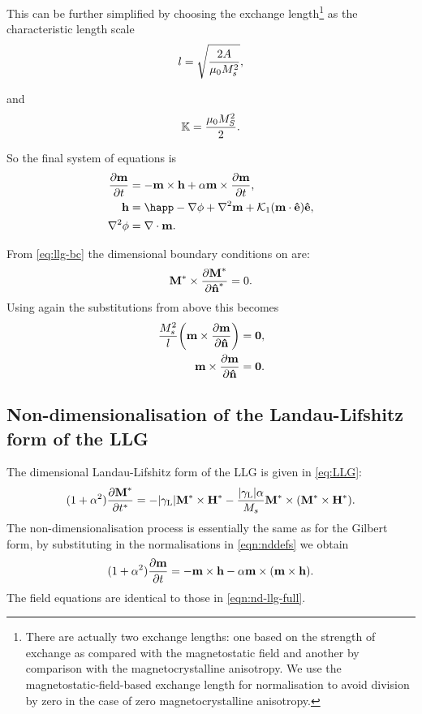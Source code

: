 This can be further simplified by choosing the exchange length\footnote{There are actually two exchange lengths: one based on the strength of exchange as compared with the magnetostatic field and another by comparison with the magnetocrystalline anisotropy. We use the magnetostatic-field-based exchange length for normalisation to avoid division by zero in the case of zero magnetocrystalline anisotropy.} as the characteristic length scale
\begin{equation}
  \label{eqn:l-normalisation}
  l = \sqrt{ \frac{2 A}{\mu_0 M_s^2} },
\end{equation}

and
\begin{equation}
  \label{k-normalisation}
  \mathbb{K} = \frac{ \mu_0 M_S^2}{2}.
\end{equation}

So the final system of equations is
\begin{equation}
  \begin{aligned}
    \dmdt &= - \mv \times \hv + \alpha \mv \times \dmdt, \\
    \hv &= \happ - \grad \phi + \lap \mv + \kone (\mv \cdot \ev) \ev, \\
    \lap \phi &= \div \mv.
    \label{eqn:nd-llg-full}
  \end{aligned}
\end{equation}

From \cref{eq:llg-bc} the dimensional boundary conditions on are:
\begin{equation}
  \boldsymbol{\mathrm{M}}^* \times \frac{\partial \boldsymbol{\mathrm{M}}^*}{\partial \boldsymbol{\mathrm{\hat{n}}}^*} = 0.
\end{equation}
Using again the substitutions from above this becomes
\begin{equation}
  \begin{aligned}
    \frac{M_s^2}{l}{\left( \boldsymbol{\mathrm{m}} \times \frac{\partial \boldsymbol{\mathrm{m}}}{\partial \boldsymbol{\mathrm{\hat{n}}}} \right)} &= \mathbf{0}, \\
    \boldsymbol{\mathrm{m}} \times \frac{\partial \boldsymbol{\mathrm{m}}}{\partial \boldsymbol{\mathrm{\hat{n}}}} &= \mathbf{0}.
    \label{eq:103}
  \end{aligned}
\end{equation}

\subsection{Non-dimensionalisation of the Landau-Lifshitz form of the LLG}
\label{sec:land-lifsh-normalisation}

The dimensional Landau-Lifshitz form of the LLG is given in \cref{eq:LLG}:
\begin{equation}
  \label{eq:ll-nd}
  (1 + \alpha^2) \frac{\partial \boldsymbol{\mathrm{M}}^*}{\partial t^*} = - {\left|{\gamma_{\mathrm{\tiny{L}}}} \right|} \boldsymbol{\mathrm{M}}^* \times \boldsymbol{\mathrm{H}}^*
  - \frac{{\left|{\gamma_{\mathrm{\tiny{L}}}} \right|} \alpha}{M_s} \boldsymbol{\mathrm{M}}^* \times (\boldsymbol{\mathrm{M}}^* \times \boldsymbol{\mathrm{H}}^*).
\end{equation}
The non-dimensionalisation process is essentially the same as for the Gilbert form, by substituting in the normalisations in \cref{eqn:nddefs} we obtain
\begin{equation}
  (1 + \alpha^2) \frac{\partial \boldsymbol{\mathrm{m}}}{\partial t} = - \boldsymbol{\mathrm{m}} \times \boldsymbol{\mathrm{h}} - \alpha \boldsymbol{\mathrm{m}} \times (\boldsymbol{\mathrm{m}} \times \boldsymbol{\mathrm{h}}).
  \label{eq:ll-nd-llglike}
\end{equation}
The field equations are identical to those in \cref{eqn:nd-llg-full}.



